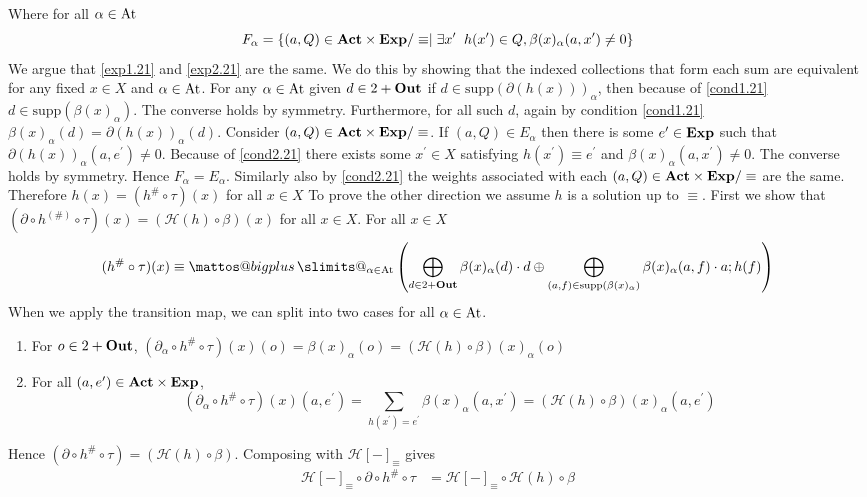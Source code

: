 \documentclass[a4paper,UKenglish,cleveref, autoref, thm-restate]{lipics-v2021}
\makeatletter
\newcommand{\Out}{\textbf{\upshape{Out}}}
\newcommand{\Act}{\textbf{\upshape{Act}}}
\newcommand{\At}{\text{\upshape{At}}}
\newcommand{\Exp}{\textbf{\upshape{Exp}}}
\theoremstyle{plain}\newtheoremrep{thm}{Theorem}[section]
\newcommand{\bigplus}{\DOTSB\mathop{\mathpalette\mattos@bigplus\relax}\slimits@
}
\newcommand\mattos@bigplus[2]{\vcenter{\hbox{\sbox\z@{$#1\sum$}\resizebox{!}{0.9\dimexpr\ht\z@+\dp\z@}{\raisebox{\depth}{$\m@th#1+$}}}}\vphantom{\sum}}
\makeatother
\begin{document}
\begin{appendixproof}
\begin{align}
		\end{align}
		Where for all $\alpha \in \At$
		$$F_\alpha = \{(a,Q) \in \Act\times \Exp/\equiv \mid\exists x^\prime\;\; h(x^\prime) \in Q, \beta(x)_\alpha(a, x^\prime)\neq0\}$$
		We argue that \cref{exp1.21} and \cref{exp2.21} are the same. We do this by showing that the indexed collections that form each sum are equivalent for any fixed $x \in X$ and $\alpha \in \At$.
		For any $\alpha \in \At$ given $d \in 2+\Out$ if $d \in \text{supp}(\partial(h(x)))_\alpha$, then because of \cref{cond1.21} $d \in \text{supp}(\beta(x)_\alpha)$. The converse holds by symmetry.  Furthermore, for all such $d$, again by condition \cref{cond1.21} $\beta(x)_\alpha(d) = \partial(h(x))_\alpha(d)$.
		Consider $(a, Q) \in \Act\times\Exp/\equiv$. If $(a, Q) \in E_\alpha$ then there is some $e^\prime \in \Exp$ such that $\partial(h(x))_\alpha(a,e^\prime) \neq 0$. Because of \cref{cond2.21} there exists some $x^\prime \in X$ satisfying $h(x^\prime) \equiv e^\prime$ and $\beta(x)_\alpha(a,x^\prime) \neq 0$. The converse holds by symmetry. Hence $F_\alpha = E_\alpha$. Similarly also by \cref{cond2.21} the weights associated with each $(a,Q) \in \Act\times \Exp/\equiv$ are the same.
		Therefore $h(x) = (h^{\#}\circ \tau)(x)$ for all $x \in X$
		To prove the other direction we assume $h$ is a solution up to $\equiv$. First we show that $(\partial\circ h^{(\#)}\circ \tau)(x) = (\mathcal{H}(h) \circ \beta)(x)$ for all $x \in X$. For all $x \in X$
		$$(h^{\#}\circ \tau)(x) \equiv \bigplus_{\alpha \in \At}\left(\bigoplus_{d \in 2+\Out} \beta(x)_\alpha(d)\cdot d \oplus \bigoplus_{(a,f) \in \text{supp}(\beta(x)_\alpha)} \beta(x)_\alpha(a, f)\cdot a;h(f)\right)$$
		When we apply the transition map, we can split into two cases for all $\alpha \in \At$.
		\begin{enumerate}
			\item For $o \in 2+\Out$, $(\partial_\alpha \circ h^{\#}\circ \tau)(x)(o) = \beta(x)_\alpha(o) = (\mathcal H (h) \circ \beta)(x)_\alpha(o)$
			\item For all $(a, e^\prime) \in \Act \times \Exp$, 
			$$(\partial_\alpha \circ h^{\#}\circ \tau)(x)(a,e^\prime) = \sum_{h(x^\prime) = e^\prime}\beta(x)_\alpha(a,x^\prime) = (\mathcal H (h) \circ \beta)(x)_\alpha(a,e^\prime)$$
		\end{enumerate}
		Hence $(\partial \circ h^{\#}\circ \tau) = (\mathcal H (h) \circ \beta)$. Composing with $\mathcal{H}[-]_\equiv$ gives
		\begin{align*}
			\mathcal{H}[-]_\equiv \circ \partial \circ h^{\#}\circ \tau &= \mathcal{H}[-]_\equiv \circ \mathcal{H}(h) \circ \beta\\

\end{align*}
\end{appendixproof}
\end{document}
